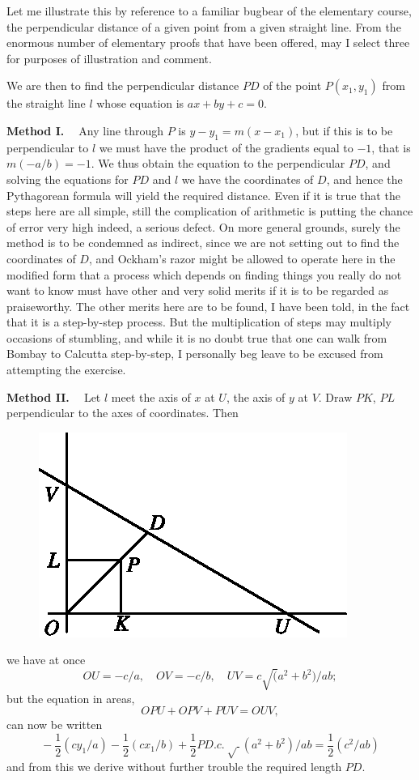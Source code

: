 Let me illustrate this by reference to a familiar bugbear of the
elementary course, the perpendicular distance of a given point from a
given straight line. From the enormous number of elementary proofs
that have been offered, may I select three for purposes of
illustration and comment.

We are then to find the perpendicular distance $PD$ of the point\break
$P(x_1, y_1)$ from the straight line $l$ whose equation is $ax + by +
c = 0$.


\medskip
\noindent
\textbf{Method I. ~} Any line through $P$ is $y - y_1 = m (x -
  x_1)$, but if this is to be perpendicular to $l$ we must have the
  product of the gradients equal to $-1$, that is $m(-a/b) = - 1$. We
  thus obtain the equation to the perpendicular $PD$, and solving the
  equations for $PD$ and $l$ we have the coordinates of $D$, and hence
  the Pythagorean formula will yield the required distance. Even if it
  is true that the steps here are all simple, still the complication
  of arithmetic is putting the chance of error very high indeed, a
  serious defect. On more general grounds, surely the method is to be
  condemned as indirect, since we are not setting out to find the
  coordinates of $D$, and Ockham's  razor might be allowed to operate
  here in the modified form that a process which depends on finding
  things you really do not want to know must have other and very solid
  merits if it is to be regarded as praiseworthy. The other merits
  here are to be found, I have been told, in the fact that it is a
  step-by-step process. But the multiplication of steps may multiply
  occasions of stumbling, and while it is no doubt true that one can
  walk from Bombay to Calcutta step-by-step, I personally beg leave to
  be excused from attempting the exercise.

\medskip
\noindent
\textbf{Method II. ~} Let $l$ meet the axis of $x$ at $U$, the axis of
$y$ at $V$. Draw $PK$, $PL$ perpendicular to the axes of coordinates. Then
\begin{figure}[H]
\centering
\includegraphics{figures/fig_01.eps}
\end{figure}\pageoriginale
we have at once
$$
OU = - c/a, \quad OV = - c/b, \quad UV = c \surd (a^2 + b^2) /ab;
$$
but the equation in areas,
$$
OPU + OPV + PUV = OUV, 
$$
can now be written
$$
{}-\frac{1}{2} (cy_1/a) - \frac{1}{2} (cx_1 /b) + \frac{1}{2}
PD. c. ~\surd~ (a^2 + b^2) / ab = \frac{1}{2} (c^2/ab)
$$
and from this we derive without further trouble the required length $PD$.

